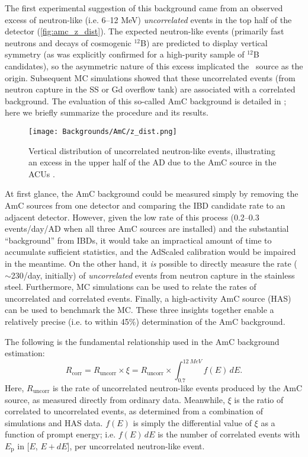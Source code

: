 \documentclass[../thesis.tex]{subfiles}
\begin{document}
The first experimental suggestion of this background came from an observed excess of neutron-like (i.e. 6--12 MeV) \emph{uncorrelated} events in the top half of the detector (\autoref{fig:amc_z_dist}). The expected neutron-like events (primarily fast neutrons and decays of cosmogenic $^{12}$B) are predicted to display vertical symmetry (as was explicitly confirmed for a high-purity sample of $^{12}$B candidates), so the asymmetric nature of this excess implicated the \AmC\ source as the origin. Subsequent MC simulations showed that these uncorrelated events (from neutron capture in the SS or Gd overflow tank) are associated with a correlated background. The evaluation of this so-called AmC background is detailed in \cite{Gu_2016}; here we briefly summarize the procedure and its results.

\begin{figure}[ht]
  \texttt{[image: Backgrounds/AmC/z\_dist.png]}
  \caption{Vertical distribution of uncorrelated neutron-like events, illustrating an excess in the upper half of the AD due to the AmC source in the ACUs \cite{Gu_2016}.}
  \label{fig:amc_z_dist}
\end{figure}

At first glance, the AmC background could be measured simply by removing the AmC sources from one detector and comparing the IBD candidate rate to an adjacent detector. However, given the low rate of this process (0.2--0.3 events/day/AD when all three AmC sources are installed) and the substantial ``background'' from IBDs, it would take an impractical amount of time to accumulate sufficient statistics, and the AdScaled calibration would be impaired in the meantime. On the other hand, it \emph{is} possible to directly measure the rate ($\sim$230/day, initially) of \emph{uncorrelated} events from neutron capture in the stainless steel. Furthermore, MC simulations can be used to relate the rates of uncorrelated and correlated events. Finally, a high-activity AmC source (HAS) can be used to benchmark the MC. These three insights together enable a relatively precise (i.e. to within 45\%) determination of the AmC background.

The following is the fundamental relationship used in the AmC background estimation:
\begin{equation}
  R_{\mathrm{corr}} = R_{\mathrm{uncorr}} \times \xi = R_{\mathrm{uncorr}} \times \int_{0.7}^{\SI{12}{MeV}} f(E)\,dE.
\end{equation}
Here, $R_{\mathrm{uncorr}}$ is the rate of uncorrelated neutron-like events produced by the AmC source, as measured directly from ordinary data. Meanwhile, $\xi$ is the ratio of correlated to uncorrelated events, as determined from a combination of simulations and HAS data. $f(E)$ is simply the differential value of $\xi$ as a function of prompt energy; i.e. $f(E)\,dE$ is the number of correlated events with $E_{\mathrm{p}}$ in [$E$, $E + dE$], per uncorrelated neutron-like event.
\end{document}
